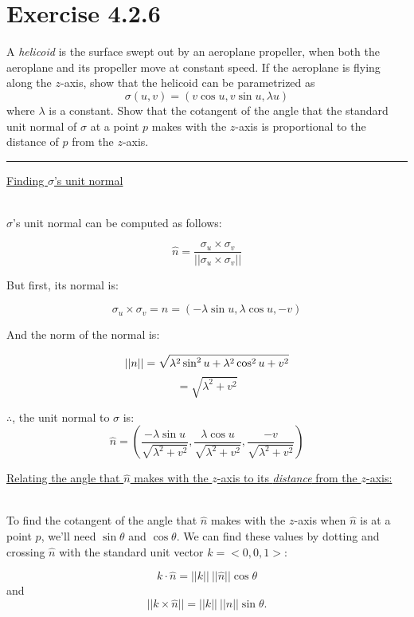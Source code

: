 \documentclass[12pt]{article}
\newcommand{\ulind}[1]
{
\noindent
\underline{#1}\\\\
\indent
}
\newcommand{\norm}[1]
{
||#1||
}
\begin{document}
\maketitle

\section*{Exercise 4.2.6}
\indent
A \emph{helicoid} is the surface swept out by an aeroplane propeller, when both the aeroplane and its propeller move at constant speed. If the aeroplane is flying along the $z$-axis, show that the helicoid can be parametrized as
$$
\sigma(u, v) = (v \cos u, v \sin u, \lambda u)
$$
where $\lambda$ is a constant. Show that the cotangent of the angle that the standard unit normal of $\sigma$ at a point $p$ makes with the $z$-axis is proportional to the distance of $p$ from the $z$-axis.

\vspace{1cm}
\hrule
\vspace{1cm}
\noindent

\ulind{Finding $\sigma$'s unit normal}
$\sigma$'s unit normal can be computed as follows:

$$
\hat{n} = \frac{\sigma_u \times \sigma_v}{||\sigma_u \times \sigma_v||}
$$

But first, its normal is:

$$
\sigma_u \times \sigma_v = n = (-\lambda \sin u, \lambda \cos u, -v)
$$

And the norm of the normal is:

$$
||n|| = \sqrt{\lambda^2 \sin^2 u + \lambda^2 \cos^2 u + v^2}\\
$$
$$
= \sqrt{\lambda^2 + v^2}
$$

$\therefore$, the unit normal to $\sigma$ is:
$$
\hat{n} = \left(\frac{-\lambda \sin u}{\sqrt{\lambda^2+v^2}}, \frac{\lambda \cos u}{\sqrt{\lambda^2+v^2}}, \frac{-v}{\sqrt{\lambda^2+v^2}}\right)
$$

\clearpage

\ulind{Relating the angle that $\hat{n}$ makes with the $z$-axis to its \emph{distance} from the $z$-axis:}

To find the cotangent of the angle that $\hat{n}$ makes with the $z$-axis when $\hat{n}$ is at a point $p$, we'll need $\sin \theta$ and $\cos \theta$. We can find these values by dotting and crossing $\hat{n}$ with the standard unit vector $k = <0,0,1>$:

$$
k \cdot \hat{n} = \norm{k} \ \norm{\hat{n}}\cos \theta
$$
and
$$
\norm{k \times \hat{n}} = \norm{k} \ \norm{\hat{n}}\sin \theta.
$$
\end{document}
